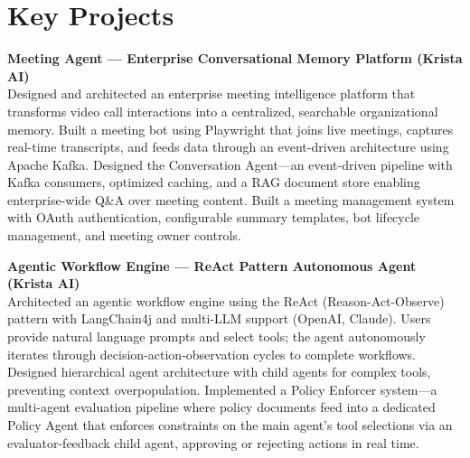 \documentclass[a4paper,11pt]{article}
\begin{document}
\section{Key Projects}

\textbf{Meeting Agent --- Enterprise Conversational Memory Platform (Krista AI)} \\
Designed and architected an enterprise meeting intelligence platform that transforms video call interactions into a centralized, searchable organizational memory. Built a meeting bot using Playwright that joins live meetings, captures real-time transcripts, and feeds data through an event-driven architecture using Apache Kafka. Designed the Conversation Agent---an event-driven pipeline with Kafka consumers, optimized caching, and a RAG document store enabling enterprise-wide Q\&A over meeting content. Built a meeting management system with OAuth authentication, configurable summary templates, bot lifecycle management, and meeting owner controls.

\vspace{6pt}
\textbf{Agentic Workflow Engine --- ReAct Pattern Autonomous Agent (Krista AI)} \\
Architected an agentic workflow engine using the ReAct (Reason-Act-Observe) pattern with LangChain4j and multi-LLM support (OpenAI, Claude). Users provide natural language prompts and select tools; the agent autonomously iterates through decision-action-observation cycles to complete workflows. Designed hierarchical agent architecture with child agents for complex tools, preventing context overpopulation. Implemented a Policy Enforcer system---a multi-agent evaluation pipeline where policy documents feed into a dedicated Policy Agent that enforces constraints on the main agent's tool selections via an evaluator-feedback child agent, approving or rejecting actions in real time.
\end{document}
